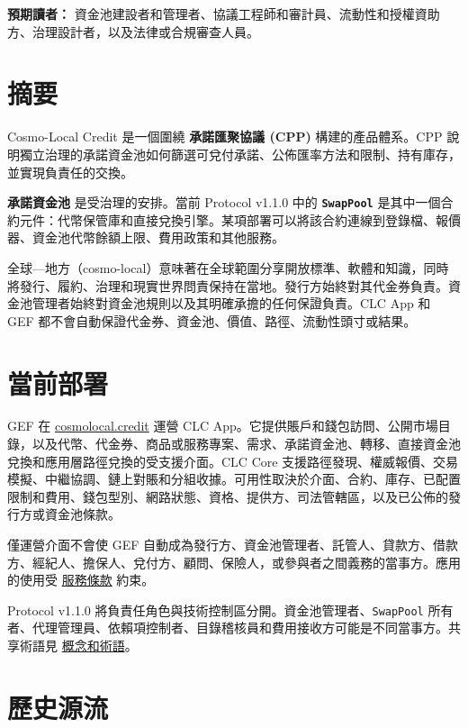 \documentclass[11pt]{article}
\begin{document}
\textbf{預期讀者：} 資金池建設者和管理者、協議工程師和審計員、流動性和授權資助方、治理設計者，以及法律或合規審查人員。

\section*{摘要}

Cosmo-Local Credit 是一個圍繞 \textbf{承諾匯聚協議 (CPP)} 構建的產品體系。CPP 說明獨立治理的承諾資金池如何篩選可兌付承諾、公佈匯率方法和限制、持有庫存，並實現負責任的交換。

\textbf{承諾資金池} 是受治理的安排。當前 Protocol v1.1.0 中的 \textbf{\texttt{SwapPool}} 是其中一個合約元件：代幣保管庫和直接兌換引擎。某項部署可以將該合約連線到登錄檔、報價器、資金池代幣餘額上限、費用政策和其他服務。

全球---地方（cosmo-local）意味著在全球範圍分享開放標準、軟體和知識，同時將發行、履約、治理和現實世界問責保持在當地。發行方始終對其代金券負責。資金池管理者始終對資金池規則以及其明確承擔的任何保證負責。CLC App 和 GEF 都不會自動保證代金券、資金池、價值、路徑、流動性頭寸或結果。

\section*{當前部署}

GEF 在 \href{https://cosmolocal.credit}{cosmolocal.credit} 運營 CLC App。它提供賬戶和錢包訪問、公開市場目錄，以及代幣、代金券、商品或服務專案、需求、承諾資金池、轉移、直接資金池兌換和應用層路徑兌換的受支援介面。CLC Core 支援路徑發現、權威報價、交易模擬、中繼協調、鏈上對賬和分組收據。可用性取決於介面、合約、庫存、已配置限制和費用、錢包型別、網路狀態、資格、提供方、司法管轄區，以及已公佈的發行方或資金池條款。

僅運營介面不會使 GEF 自動成為發行方、資金池管理者、託管人、貸款方、借款方、經紀人、擔保人、兌付方、顧問、保險人，或參與者之間義務的當事方。應用的使用受 \href{https://docs.cosmolocal.credit/zh-Hant/governance/terms}{服務條款} 約束。

Protocol v1.1.0 將負責任角色與技術控制區分開。資金池管理者、\texttt{SwapPool} 所有者、代理管理員、依賴項控制者、目錄稽核員和費用接收方可能是不同當事方。共享術語見 \href{https://docs.cosmolocal.credit/zh-Hant/introduction/concepts}{概念和術語}。

\section*{歷史源流}
\end{document}
